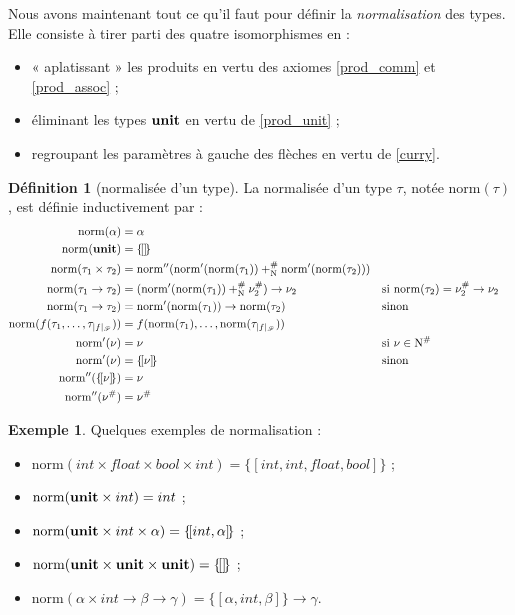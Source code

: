 \documentclass[a4paper]{report}
\theoremstyle{definition}
\newtheorem{definition}[theoreme]{Définition}
\newtheorem{exemple}[theoreme]{Exemple}
\newcommand{\mset}[1]{\{\![#1]\!\}}
\newcommand{\unit}{\bold{unit}}
\newcommand{\norm}{\mathrm{norm}}
\newcommand{\F}{\mathscr{F}}
\newcommand{\N}{\mathrm{N}}
\begin{document}
Nous avons maintenant tout ce qu'il faut pour définir la \emph{normalisation} des types. Elle consiste à tirer parti des quatre isomorphismes en :
\begin{itemize}[nosep]
  \item « aplatissant » les produits en vertu des axiomes \eqref{prod_comm} et \eqref{prod_assoc} ;
  \item éliminant les types $\unit$ en vertu de \eqref{prod_unit} ;
  \item regroupant les paramètres à gauche des flèches en vertu de \eqref{curry}.
\end{itemize}

\begin{definition}[normalisée d'un type]
  La normalisée d'un type $\tau$, notée $\norm (\tau)$, est définie inductivement par :
  \begin{align*}
      \norm (\alpha) &=
      \alpha
    \\
      \norm (\unit) &=
      \mset{}
    \\
      \norm (\tau_1 \times \tau_2) &=
      \norm'' (\norm' (\norm (\tau_1)) +^\#_\N \norm' (\norm (\tau_2)))
    \\
      \norm (\tau_1 \rightarrow \tau_2) &=
      (\norm' (\norm (\tau_1)) +^\#_\N \nu^\#_2) \rightarrow \nu_2 &&
      \text{si } \norm (\tau_2) = \nu^\#_2 \rightarrow \nu_2
    \\
      \norm (\tau_1 \rightarrow \tau_2) &=
      \norm' (\norm (\tau_1)) \rightarrow \norm (\tau_2) &&
      \text{sinon}
    \\
      \norm (f (\tau_1, \dots, \tau_{|f|_\F})) &=
      f (\norm (\tau_1), \dots, \norm (\tau_{|f|_\F}))
    \\
      \norm' (\nu) &=
      \nu &&
      \text{si } \nu \in \N^\#
    \\
      \norm' (\nu) &=
      \mset{\nu} &&
      \text{sinon}
    \\
      \norm'' (\mset{\nu}) &=
      \nu
    \\
      \norm'' (\nu^\#) &=
      \nu^\#
  \end{align*}
\end{definition}

\begin{exemple}
  Quelques exemples de normalisation :
  \begin{itemize}
    \item $\norm (int \times float \times bool \times int) = \mset{int, int, float, bool}$ ;
    \item $\norm (\unit \times int) = int$ ;
    \item $\norm (\unit \times int \times \alpha) = \mset{int, \alpha}$ ;
    \item $\norm (\unit \times \unit \times \unit) = \mset{}$ ;
    \item $\norm (\alpha \times int \rightarrow \beta \rightarrow \gamma) = \mset{\alpha, int, \beta} \rightarrow \gamma$.
  \end{itemize}
\end{exemple}
\end{document}
